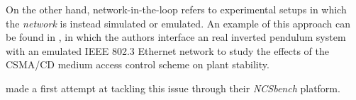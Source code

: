 On the other hand, network-in-the-loop refers to experimental setups in which the \emph{network} is instead simulated or emulated.
An example of this approach can be found in \textcite{Natale2004InvPendEthernet}, in which the authors interface an real inverted pendulum system with an emulated IEEE 802.3 Ethernet network to study the effects of the \ac{CSMA/CD} medium access control scheme on plant stability.



\textcite{Zoppi2020NCSBench} made a first attempt at tackling this issue through their \emph{NCSbench} platform.




